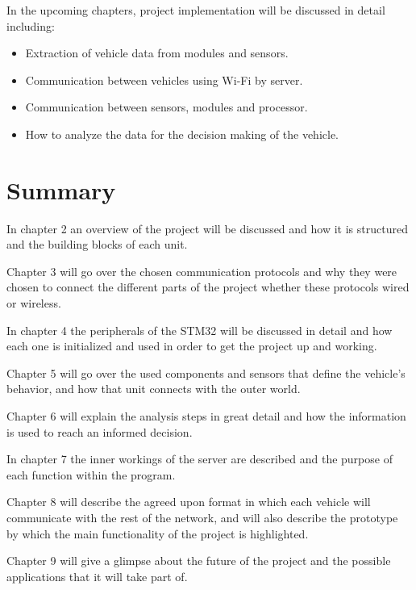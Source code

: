 In the upcoming chapters, project implementation will be discussed in detail including:
\begin{itemize}
    \item Extraction of vehicle data from modules and sensors.
    \item Communication between vehicles using Wi-Fi by server.
    \item Communication between sensors, modules and processor.
    \item How to analyze the data for the decision making of the vehicle.
\end{itemize}

\section{Summary}

In chapter 2 an overview of the project will be discussed and how it is structured and the building blocks of each unit.

Chapter 3 will go over the chosen communication protocols and why they were chosen to connect the different parts of the project whether these protocols wired or wireless. 

In chapter 4 the peripherals of the STM32 will be discussed in detail and how each one is initialized and used in order to get the project up and working.

Chapter 5 will go over the used components and sensors that define the vehicle's behavior, and how that unit connects with the outer world.

Chapter 6 will explain the analysis steps in great detail and how the information is used to reach an informed decision.

In chapter 7 the inner workings of the server are described and the purpose of each function within the program.

Chapter 8 will describe the agreed upon format in which each vehicle will communicate with the rest of the network, and will also describe the prototype by which the main functionality of the project is highlighted.

Chapter 9 will give a glimpse about the future of the project and the possible applications that it will take part of.


